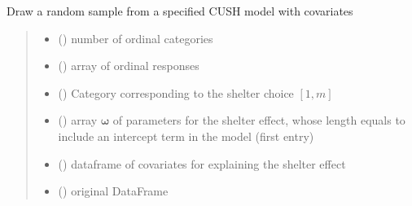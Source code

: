 \documentclass[letterpaper,10pt,english]{sphinxmanual}
\begin{document}
\begin{fulllineitems}
\label{\detokenize{cubmods:cubmods.cush_x.draw}}
\pysigstartsignatures
{}
\pysigstopsignatures
\sphinxAtStartPar
Draw a random sample from a specified CUSH model with covariates
\begin{quote}\begin{description}
\begin{itemize}
\item {} 
\sphinxAtStartPar
{} () \textendash{} number of ordinal categories

\item {} 
\sphinxAtStartPar
{} () \textendash{} array of ordinal responses

\item {} 
\sphinxAtStartPar
{} () \textendash{} Category corresponding to the shelter choice \([1,m]\)

\item {} 
\sphinxAtStartPar
{} () \textendash{} array \(\pmb \omega\) of parameters for the shelter effect, whose length equals 
 to include an intercept term in the model (first entry)

\item {} 
\sphinxAtStartPar
{} () \textendash{} dataframe of covariates for explaining the shelter effect

\item {} 
\sphinxAtStartPar
{} () \textendash{} original DataFrame


\end{itemize}
\end{description}
\end{quote}
\end{fulllineitems}
\end{document}
